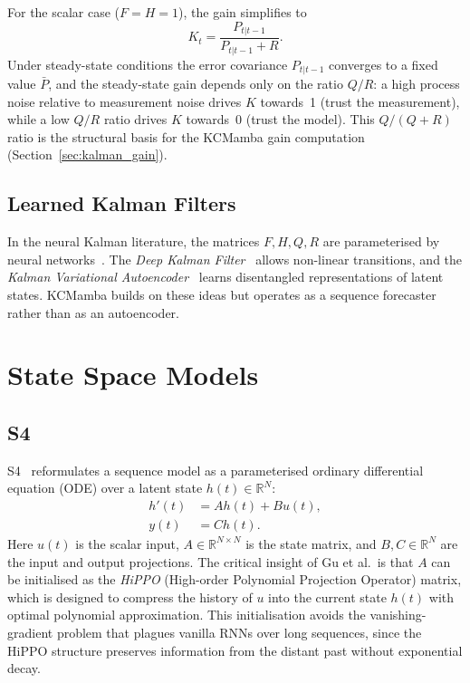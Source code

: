 For the scalar case ($F = H = 1$), the gain simplifies to
\begin{equation}
    K_t = \frac{P_{t|t-1}}{P_{t|t-1} + R}.
    \label{eq:kalman_gain_scalar}
\end{equation}
Under steady-state conditions the error covariance $P_{t|t-1}$ converges to a
fixed value $\bar{P}$, and the steady-state gain depends only on the ratio
$Q/R$: a high process noise relative to measurement noise drives $K$
towards~1 (trust the measurement), while a low $Q/R$ ratio drives $K$
towards~0 (trust the model). This $Q/(Q+R)$ ratio is the structural basis
for the KCMamba gain computation (Section~\ref{sec:kalman_gain}).

\subsection{Learned Kalman Filters}

In the neural Kalman literature, the matrices $F, H, Q, R$ are parameterised
by neural networks~\cite{krishnan2015deep,fraccaro2017disentangled}.
The \emph{Deep Kalman Filter}~\cite{krishnan2015deep} allows non-linear
transitions, and the \emph{Kalman Variational Autoencoder}~\cite{fraccaro2017disentangled}
learns disentangled representations of latent states.
KCMamba builds on these ideas but operates as a sequence forecaster rather
than as an autoencoder.

\section{State Space Models}
\label{sec:ssm}

\subsection{S4}

S4~\cite{gu2021s4} reformulates a sequence model as a parameterised ordinary
differential equation (ODE) over a latent state $h(t) \in \mathbb{R}^N$:
\begin{align}
    h'(t) &= A h(t) + B u(t), \label{eq:s4_continuous}\\
    y(t)  &= C h(t). \label{eq:s4_output}
\end{align}
Here $u(t)$ is the scalar input, $A \in \mathbb{R}^{N \times N}$ is the
state matrix, and $B, C \in \mathbb{R}^N$ are the input and output projections.
The critical insight of Gu et al.\ is that $A$ can be initialised as the
\emph{HiPPO} (High-order Polynomial Projection Operator) matrix, which is
designed to compress the history of $u$ into the current state $h(t)$ with
optimal polynomial approximation. This initialisation avoids the
vanishing-gradient problem that plagues vanilla RNNs over long sequences,
since the HiPPO structure preserves information from the distant past without
exponential decay.

